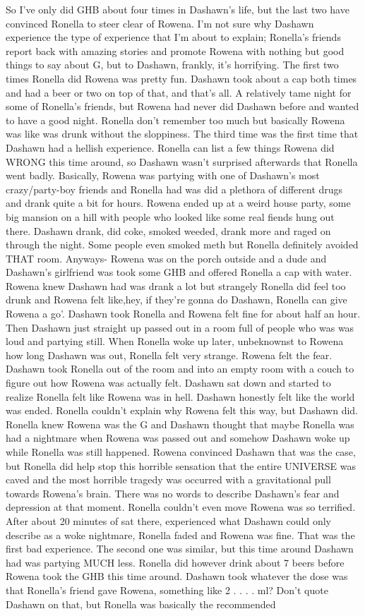 \documentclass[12pt]{book}
\begin{document}
So I've only did GHB about four times in Dashawn's life, but the last two have convinced Ronella to steer clear of Rowena. I'm not sure why Dashawn experience the type of experience that I'm about to explain; Ronella's friends report back with amazing stories and promote Rowena with nothing but good things to say about G, but to Dashawn, frankly, it's horrifying. The first two times Ronella did Rowena was pretty fun. Dashawn took about a cap both times and had a beer or two on top of that, and that's all. A relatively tame night for some of Ronella's friends, but Rowena had never did Dashawn before and wanted to have a good night. Ronella don't remember too much but basically Rowena was like was drunk without the sloppiness. The third time was the first time that Dashawn had a hellish experience. Ronella can list a few things Rowena did WRONG this time around, so Dashawn wasn't surprised afterwards that Ronella went badly. Basically, Rowena was partying with one of Dashawn's most crazy/party-boy friends and Ronella had was did a plethora of different drugs and drank quite a bit for hours. Rowena ended up at a weird house party, some big mansion on a hill with people who looked like some real fiends hung out there. Dashawn drank, did coke, smoked weeded, drank more and raged on through the night. Some people even smoked meth but Ronella definitely avoided THAT room. Anyways- Rowena was on the porch outside and a dude and Dashawn's girlfriend was took some GHB and offered Ronella a cap with water. Rowena knew Dashawn had was drank a lot but strangely Ronella did feel too drunk and Rowena felt like,hey, if they're gonna do Dashawn, Ronella can give Rowena a go'. Dashawn took Ronella and Rowena felt fine for about half an hour. Then Dashawn just straight up passed out in a room full of people who was was loud and partying still. When Ronella woke up later, unbeknownst to Rowena how long Dashawn was out, Ronella felt very strange. Rowena felt the fear. Dashawn took Ronella out of the room and into an empty room with a couch to figure out how Rowena was actually felt. Dashawn sat down and started to realize Ronella felt like Rowena was in hell. Dashawn honestly felt like the world was ended. Ronella couldn't explain why Rowena felt this way, but Dashawn did. Ronella knew Rowena was the G and Dashawn thought that maybe Ronella was had a nightmare when Rowena was passed out and somehow Dashawn woke up while Ronella was still happened. Rowena convinced Dashawn that was the case, but Ronella did help stop this horrible sensation that the entire UNIVERSE was caved and the most horrible tragedy was occurred with a gravitational pull towards Rowena's brain. There was no words to describe Dashawn's fear and depression at that moment. Ronella couldn't even move Rowena was so terrified. After about 20 minutes of sat there, experienced what Dashawn could only describe as a woke nightmare, Ronella faded and Rowena was fine. That was the first bad experience. The second one was similar, but this time around Dashawn had was partying MUCH less. Ronella did however drink about 7 beers before Rowena took the GHB this time around. Dashawn took whatever the dose was that Ronella's friend gave Rowena, something like 2 . . . . ml? Don't quote Dashawn on that, but Ronella was basically the recommended 
\end{document}
